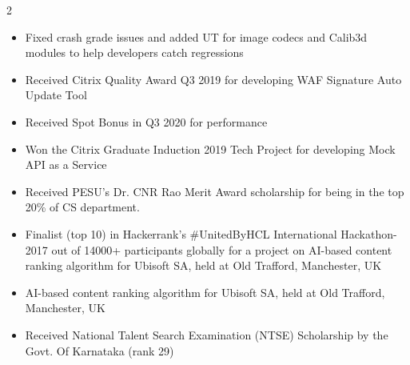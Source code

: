 \documentclass[10pt,a4paper,ragged2e,withhyper]{altacv}
\begin{document}
\begin{paracol}{2}
\begin{itemize}
\item
\begin{justify}
Fixed crash grade issues and added UT for image codecs and Calib3d modules to help developers catch regressions
\end{justify}
\end{itemize}



\divider






\begin{itemize}

\item \begin{justify} Received Citrix Quality Award Q3 2019 for developing WAF Signature Auto Update Tool \end{justify}
\item \begin{justify} Received Spot Bonus in Q3 2020 for performance \end{justify}
\item \begin{justify} Won the Citrix Graduate Induction 2019 Tech Project for developing Mock API as a Service \end{justify}
\item \begin{justify} Received PESU's Dr. CNR Rao Merit Award scholarship for being in the top 20\% of CS department. \end{justify}
\item Finalist (top 10) in Hackerrank's \#UnitedByHCL International Hackathon-2017 out of 14000+ participants globally for a project on AI-based content ranking algorithm for Ubisoft SA, held at Old Trafford, Manchester, UK
\item \begin{justify} AI-based content ranking algorithm for Ubisoft SA, held at Old Trafford, Manchester, UK \end{justify}
\item \begin{justify} Received National Talent Search Examination (NTSE) Scholarship by the Govt. Of Karnataka (rank 29) \end{justify}
\end{itemize}



\end{paracol}
\end{document}
